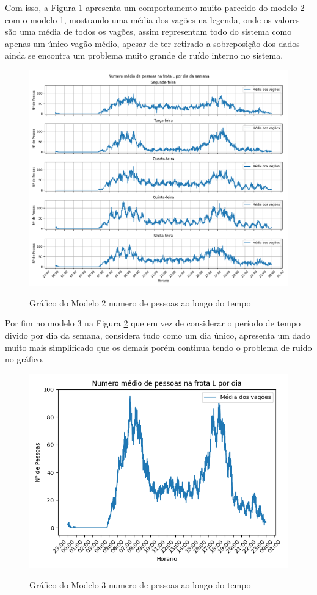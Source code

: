 \documentclass[acronym,symbols,table]{fei}
\begin{document}
\newpage 

Com isso, a Figura \ref{fig:modelo2} apresenta um comportamento muito parecido do modelo 2 com o modelo 1, mostrando uma média dos vagões na legenda, onde os valores são uma média de todos os vagões, assim representam todo do sistema como apenas um único vagão médio, apesar de ter retirado a sobreposição dos dados ainda se encontra um problema muito grande de ruído interno no sistema. 

\begin{figure}[!htb]
    \centering
	\caption{Gráfico do Modelo 2 numero de pessoas ao longo do tempo}
    \includegraphics[width=0.75\linewidth]{Imagens/Modelo_2-Numero_medio_de_pessoas_na_frota_L_por_dia_da_semana.png}
    \label{fig:modelo2}
\end{figure}

Por fim no modelo 3 na Figura \ref{fig:modelo3} que em vez de considerar o período de tempo divido por dia da semana, considera tudo como um dia único, apresenta um dado muito mais simplificado que os demais porém continua tendo o problema de ruido no gráfico.

\begin{figure}[!htb]
    \centering
	\caption{Gráfico do Modelo 3 numero de pessoas ao longo do tempo}
    \includegraphics[width=0.7\linewidth]{Imagens/Modelo_3-Numero_medio_de_pessoas_na_frota_L_por_dia.png}
    \label{fig:modelo3}
\end{figure}
\end{document}
